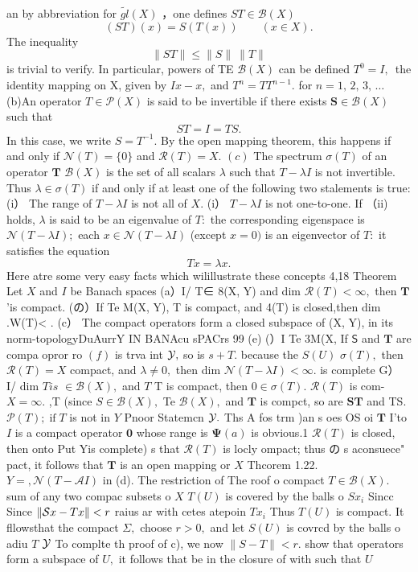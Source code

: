 an by abbreviation for ${\tilde{g l}}(X)$ ，one defines $S T\in{\mathcal{B}}(X)$ $$ (S T)(x)=S(T(x))\qquad(x\in X). $$ The inequality $$ \|S T\|\leq\|S\|\ \|T\| $$ is trivial to verify. In particular, powers of TE ${\mathcal{B}}(X)$ can be defined $T^{0}=I,\,$ the identity mapping on X, given by $I x-x,$ and $T^{n}=T T^{n-1}.$ for $n=1,\,2,\,3,\,\ldots$ (b)An operator $T\in{\mathcal{P}}(X)$ is said to be invertible if there exists $\mathbf{S}\in{\mathcal{B}}(X)$ such that $$ S T=I=T S. $$ In this case, we write $S=T^{-1}.$ By the open mapping theorem, this happens if and only if ${\mathcal{N}}(T)=\{0\}$ and ${\mathcal{R}}(T)=X.$ $\left(c\right)$ The spectrum $\sigma(T)$ of an operator ${\boldsymbol{T}}$ ${\mathcal{B}}(X)$ is the set of all scalars $\lambda$ such that $T-\lambda I$ is not invertible. Thus $\lambda\in\sigma(T)$ if and only if at least one of the following two stalements is true: (i） The range of $T-\lambda I$ is not all of $X.$ (i） $T-\lambda I$ is not one-to-one. If （ii) holds, $\lambda$ is said to be an eigenvalue of $T\colon$ the corresponding eigenspace is ${\mathcal{N}}(T-\lambda I);$ each $x\in{\mathcal{N}}(T-\lambda I)$ (except $x=0)$ is an eigenvector of $T\colon$ it satisfies the equation $$ T x=\lambda x. $$ Here atre some very easy facts which wilillustrate these concepts 4,18 Theorem Let $\textstyle X$ and $\boldsymbol{\mathit{I}}$ be Banach spaces (a）I/ T∈ 8(X, Y) and dim ${\mathcal{R}}(T)<\infty,$ then ${\boldsymbol{T}}$ 'is compact. (の）If Te M(X, Y), T is compact, and 4(T) is closed,then dim .W(T)< . (c） The compact operators form a closed subspace of (X, Y), in its norm-topologyDuAurrY IN BANAcu sPACrs 99 (e) (）I Te 3M(X, If $\boldsymbol{\mathsf{S}}$ and ${\boldsymbol{T}}$ are compa opror ro $\left(f\right)$ is trva int ${\cal Y},$ so is $s+T.$ because the $S(U)$ $\sigma(T),$ then ${\mathcal{R}}(T)=X$ compact, and ${\lambda\neq0},$ then dim ${\mathcal{N}}(T-\lambda I)<\infty.$ is complete G） I/ dim $T i s$ $\in{\mathcal{B}}(X),$ and ${\mathbf{}}T$ T is compact, then $0\in\sigma(T).$ ${\mathcal{R}}(T)$ is com- $X=\infty.$ ,T (since $S\in{\mathcal{B}}(X),$ Te ${\mathcal{B}}(X),$ and ${\boldsymbol{T}}$ is compct, so are ${\boldsymbol{S}}{\boldsymbol{T}}$ and TS. ${\mathcal{P}}(T);\operatorname{if}T$ is not in ${\mathbf{}}Y$ Pnoor Statemcn ${\cal Y}.$ Ths A fos trm )an s oes OS oi ${\boldsymbol{T}}$ I'to $\boldsymbol{\mathit{I}}$ is a compact operator $\mathbf{0}$ whose range is $\mathbf{\Psi}(a)$ is obvious.1 ${\mathcal{R}}(T)$ is closed, then onto Put Yis complete) s that ${\mathcal{R}}(T)$ is locly ompact; thus の s aconsuece" pact, it follows that ${\boldsymbol{T}}$ is an open mapping or $\textstyle X$ Thcorem 1.22. $Y=,{\mathcal{N}}(T-{\mathcal{A}}I)$ in (d). The restriction of The roof o compact $T\in{\mathcal{B}}(X).$ sum of any two compac subsets o $\textstyle X$ $T(U)$ is covered by the balls o $S x_{i}$ Sincc Since $\|{\cal S}x-T x\|<r$ raius ar with cetes atepoin $\scriptstyle T x_{i}$ Thus $T(U)$ is compact. It fllowsthat the compact $\Sigma,$ choose $r>0,$ and let $S(U)$ is covrcd by the balls o adiu ${\mathbf{}}T$ ${\cal{Y}}$ To complte th proof of c), we now $\|S-T\|<r.$ show that operators form a subspace of $U,$ it follows that be in the closure of with such that $U$ 